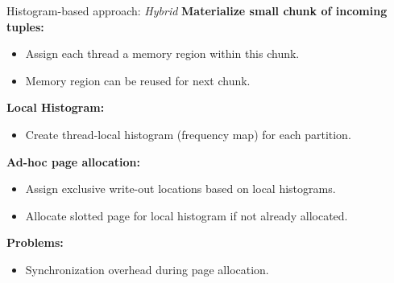\begin{frame}{Histogram-based approach: \emph{Hybrid}}
  \textbf{Materialize small chunk of incoming tuples:}
  \begin{itemize}
    \vspace{-1.5em}
    \item Assign each thread a memory region within this chunk.
    \item Memory region can be reused for next chunk.
  \end{itemize}
  \textbf{Local Histogram:}
  \begin{itemize}
    \vspace{-1.5em}
    \item Create thread-local histogram (frequency map) for each partition.
  \end{itemize}
  \textbf{Ad-hoc page allocation:}
  \begin{itemize}
    \vspace{-1.5em}
    \item Assign exclusive write-out locations based on local histograms.
    \item Allocate slotted page for local histogram if not already allocated.
  \end{itemize}
  \textbf{Problems:}
  \begin{itemize}
    \vspace{-1.5em}
    \item Synchronization overhead during page allocation.
  \end{itemize}
\end{frame}

